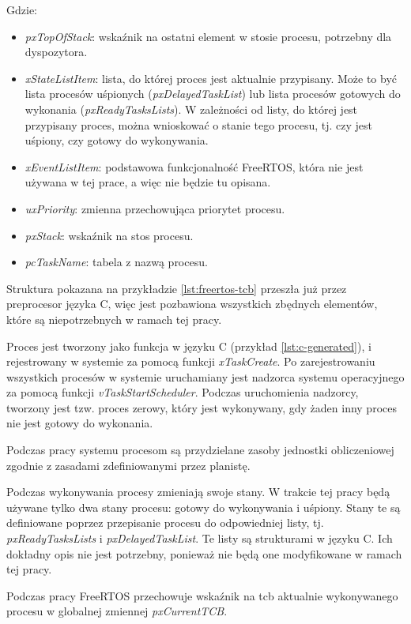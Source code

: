 \documentclass[../../main]{subfiles}
\begin{document}
Gdzie:

\begin{itemize}
    \item \textit{pxTopOfStack}: wskaźnik na ostatni element w stosie procesu, potrzebny dla dyspozytora.
    \item \textit{xStateListItem}: lista, do której proces jest aktualnie przypisany. Może to być lista procesów uśpionych (\textit{pxDelayedTaskList}) lub lista procesów gotowych do wykonania (\textit{pxReadyTasksLists}). W zależności od listy, do której jest przypisany proces, można wnioskować o stanie tego procesu, tj. czy jest uśpiony, czy gotowy do wykonywania.
    \item \textit{xEventListItem}: podstawowa funkcjonalność FreeRTOS, która nie jest używana w tej prace, a więc nie będzie tu opisana.
    \item \textit{uxPriority}: zmienna przechowująca priorytet procesu.
    \item \textit{pxStack}: wskaźnik na stos procesu.
    \item \textit{pcTaskName}: tabela z nazwą procesu. 
\end{itemize}

Struktura pokazana na przykładzie \ref{lst:freertos-tcb} przeszła już przez preprocesor języka C, więc jest pozbawiona wszystkich zbędnych elementów, które są niepotrzebnych w ramach tej pracy.

Proces jest tworzony jako funkcja w języku C (przykład \ref{lst:c-generated}), i rejestrowany w systemie za pomocą funkcji \textit{xTaskCreate}. Po zarejestrowaniu wszystkich procesów w systemie uruchamiany jest nadzorca systemu operacyjnego za pomocą funkcji \textit{vTaskStartScheduler}. Podczas uruchomienia nadzorcy, tworzony jest tzw. proces zerowy, który jest wykonywany, gdy żaden inny proces nie jest gotowy do wykonania.

Podczas pracy systemu procesom są przydzielane zasoby jednostki obliczeniowej zgodnie z zasadami zdefiniowanymi przez planistę.

Podczas wykonywania procesy zmieniają swoje stany. W trakcie tej pracy będą używane tylko dwa stany procesu: gotowy do wykonywania i uśpiony. Stany te są definiowane poprzez przepisanie procesu do odpowiedniej listy, tj. \textit{pxReadyTasksLists} i \textit{pxDelayedTaskList}. Te listy są strukturami w języku C. Ich dokładny opis nie jest potrzebny, ponieważ nie będą one modyfikowane w ramach tej pracy.

Podczas pracy FreeRTOS przechowuje wskaźnik na \acrshort{tcb} aktualnie wykonywanego procesu w globalnej zmiennej \textit{pxCurrentTCB}.
\end{document}
